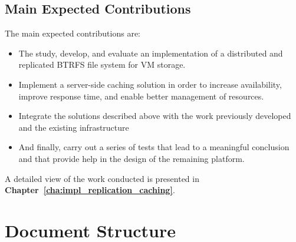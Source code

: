 



\subsection{Main Expected Contributions} %
\label{sub:main_expected_contributions}

The main expected contributions are: 

\begin{itemize}

  \item The study, develop, and evaluate an implementation of a distributed and replicated BTRFS file system for VM storage.
  \item Implement a server-side caching solution in order to increase availability, improve response time, and enable better management of resources.
  \item Integrate the solutions described above  with the work previously developed and the existing infrastructure
  \item And finally, carry out a series of tests that lead to a meaningful conclusion and that provide help in the design of the remaining platform.

\end{itemize}

A detailed view of the work conducted is presented in \textbf{Chapter~\ref{cha:impl_replication_caching}}.


\section{Document Structure} %
\label{sec:document_structure}

